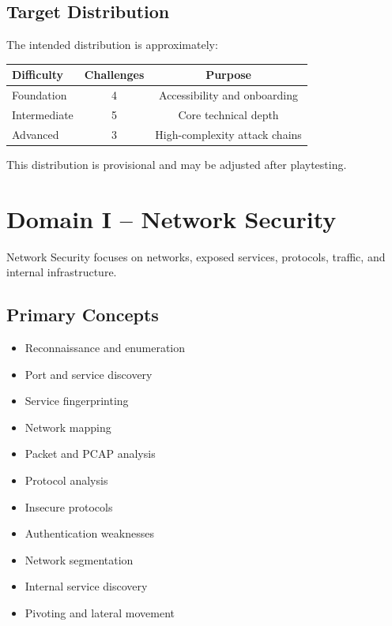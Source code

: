\documentclass[11pt,a4paper]{article}
\begin{document}
\subsection{Target Distribution}

The intended distribution is approximately:

\begin{center}

\begin{tabular}{lcc}

\toprule

\textbf{Difficulty} &
\textbf{Challenges} &
\textbf{Purpose}
\\

\midrule

Foundation &
4 &
Accessibility and onboarding
\\

Intermediate &
5 &
Core technical depth
\\

Advanced &
3 &
High-complexity attack chains
\\

\bottomrule

\end{tabular}

\end{center}

This distribution is provisional and may be adjusted after
playtesting.



\section{Domain I -- Network Security}

Network Security focuses on networks, exposed services, protocols,
traffic, and internal infrastructure.

\subsection{Primary Concepts}

\begin{itemize}

    \item Reconnaissance and enumeration
    \item Port and service discovery
    \item Service fingerprinting
    \item Network mapping
    \item Packet and PCAP analysis
    \item Protocol analysis
    \item Insecure protocols
    \item Authentication weaknesses
    \item Network segmentation
    \item Internal service discovery
    \item Pivoting and lateral movement

\end{itemize}
\end{document}
